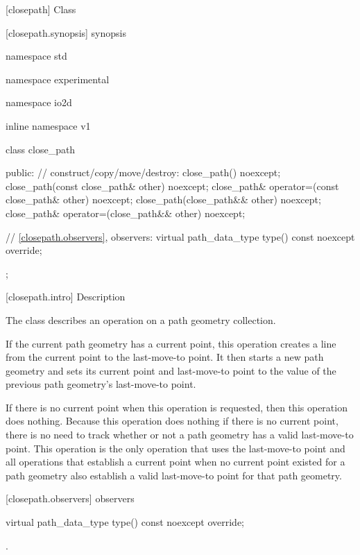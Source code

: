 [closepath] {Class }

 [closepath.synopsis] { synopsis}

\begin{codeblock}
namespace std { namespace experimental { namespace io2d { inline namespace v1 {
  class close_path {
  public:
    // construct/copy/move/destroy:
    close_path() noexcept;
    close_path(const close_path& other) noexcept;
    close_path& operator=(const close_path& other) noexcept;
    close_path(close_path&& other) noexcept;
    close_path& operator=(close_path&& other) noexcept;

    // \ref{closepath.observers}, observers:
    virtual path_data_type type() const noexcept override;
  };
} } } }
\end{codeblock}

 [closepath.intro] { Description}

\pnum
{}
The class  describes an operation on a path geometry collection.

\pnum
If the current path geometry has a current point, this operation creates a line from the current point to the last-move-to point. It then starts a new path geometry and sets its current point and last-move-to point to the value of the previous path geometry's last-move-to point.

\pnum
If there is no current point when this operation is requested, then this operation does nothing.
\enternote
Because this operation does nothing if there is no current point, there is no need to track whether or not a path geometry has a valid last-move-to point. This operation is the only operation that uses the last-move-to point and all operations that establish a current point when no current point existed for a path geometry also establish a valid last-move-to point for that path geometry.
\exitnote

 [closepath.observers]{ observers}

\begin{itemdecl}
    virtual path_data_type type() const noexcept override;
\end{itemdecl}
\begin{itemdescr}
	\pnum
	\returns
	.

\end{itemdescr}
